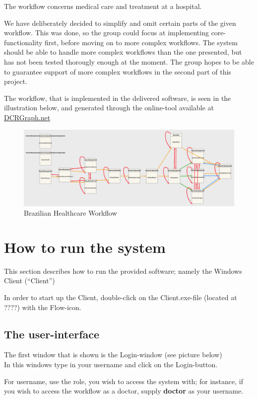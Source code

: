 The workflow concerns medical care and treatment at a hospital.

We have deliberately decided to simplify and omit certain parts of the
given workflow. This was done, so the group could focus at implementing
core-functionality first, before moving on to more complex workflows.
The system should be able to handle more complex workflows than the one
presented, but has not been tested thorougly enough at the moment. The
group hopes to be able to guarantee support of more complex workflows in
the second part of this project.

The workflow, that is implemented in the delivered software, is seen in
the illustration below, and generated through the online-tool available
at \href{www.dcrgraph.net}{DCRGraph.net}

\begin{figure}[htbp]
\centering
\includegraphics{Workflow.png}
\caption{Brazilian Healthcare Workflow}
\end{figure}

\section{How to run the system}\label{how-to-run-the-system}

This section describes how to run the provided software; namely the
Windows Client (``Client'')

In order to start up the Client, double-click on the Client.exe-file
(located at ????) with the Flow-icon.

\subsection{The user-interface}\label{the-user-interface}

The first window that is shown is the Login-window (see picture
below)\\In this windows type in your username and click on the
Login-button.

For username, use the role, you wish to access the system with; for
instance, if you wish to access the workflow as a doctor, supply
\textbf{doctor} as your username.


